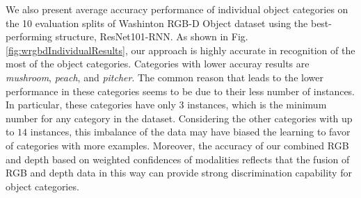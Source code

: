 We also present average accuracy performance of individual object categories on the 10 evaluation splits of Washinton RGB-D Object dataset using the best-performing structure, ResNet101-RNN. As shown in Fig. \ref{fig:wrgbdIndividualResults}, our approach is highly accurate in recognition of the most of the object categories. Categories with lower accuray results are \textit{mushroom}, \textit{peach}, and \textit{pitcher}. The common reason that leads to the lower performance in these categories seems to be due to their less number of instances. In particular, these categories have only $3$ instances, which is the minimum number for any category in the dataset. Considering the other categories with up to $14$ instances, this imbalance of the data may have biased the learning to favor of categories with more examples. Moreover, the accuracy of our combined RGB and depth based on weighted confidences of modalities reflects that the fusion of RGB and depth data in this way can provide strong discrimination capability for object categories.

